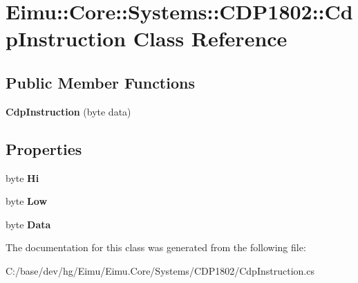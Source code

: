 \hypertarget{class_eimu_1_1_core_1_1_systems_1_1_c_d_p1802_1_1_cdp_instruction}{
\section{Eimu::Core::Systems::CDP1802::CdpInstruction Class Reference}
\label{class_eimu_1_1_core_1_1_systems_1_1_c_d_p1802_1_1_cdp_instruction}
}
\subsection*{Public Member Functions}
\begin{DoxyCompactItemize}
\item 
\hypertarget{class_eimu_1_1_core_1_1_systems_1_1_c_d_p1802_1_1_cdp_instruction_a213521de04eaef2c87b4e6edfab90bae}{
{\bfseries CdpInstruction} (byte data)}
\label{class_eimu_1_1_core_1_1_systems_1_1_c_d_p1802_1_1_cdp_instruction_a213521de04eaef2c87b4e6edfab90bae}

\end{DoxyCompactItemize}
\subsection*{Properties}
\begin{DoxyCompactItemize}
\item 
\hypertarget{class_eimu_1_1_core_1_1_systems_1_1_c_d_p1802_1_1_cdp_instruction_a283e3a21f3f8f668adcc49614ecb1c27}{
byte {\bfseries Hi}}
\label{class_eimu_1_1_core_1_1_systems_1_1_c_d_p1802_1_1_cdp_instruction_a283e3a21f3f8f668adcc49614ecb1c27}

\item 
\hypertarget{class_eimu_1_1_core_1_1_systems_1_1_c_d_p1802_1_1_cdp_instruction_a6004175628f54fda09c71e97db647d33}{
byte {\bfseries Low}}
\label{class_eimu_1_1_core_1_1_systems_1_1_c_d_p1802_1_1_cdp_instruction_a6004175628f54fda09c71e97db647d33}

\item 
\hypertarget{class_eimu_1_1_core_1_1_systems_1_1_c_d_p1802_1_1_cdp_instruction_ac6d324ac44ac657eae1ccc4466baab41}{
byte {\bfseries Data}}
\label{class_eimu_1_1_core_1_1_systems_1_1_c_d_p1802_1_1_cdp_instruction_ac6d324ac44ac657eae1ccc4466baab41}

\end{DoxyCompactItemize}


The documentation for this class was generated from the following file:\begin{DoxyCompactItemize}
\item 
C:/base/dev/hg/Eimu/Eimu.Core/Systems/CDP1802/CdpInstruction.cs\end{DoxyCompactItemize}
